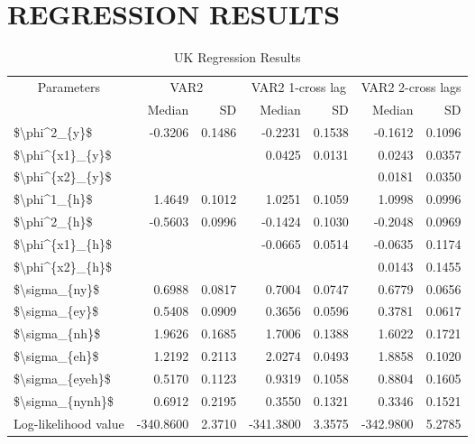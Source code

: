 \documentclass[
]{article}
\author{}
\date{\vspace{-2.5em}}
\begin{document}
\hypertarget{regression-results}{%
\section{REGRESSION RESULTS}\label{regression-results}}

\begin{table}

\caption{\label{tab:unnamed-chunk-1}UK Regression Results}
\centering
\begin{tabular}[t]{lrrrrrr}
\toprule
\multicolumn{1}{c}{Parameters} & \multicolumn{2}{c}{VAR2} & \multicolumn{2}{c}{VAR2 1-cross lag} & \multicolumn{2}{c}{VAR2 2-cross lags} \\
\cmidrule(l{3pt}r{3pt}){1-1} \cmidrule(l{3pt}r{3pt}){2-3} \cmidrule(l{3pt}r{3pt}){4-5} \cmidrule(l{3pt}r{3pt}){6-7}
  & Median & SD & Median & SD & Median & SD\\
\midrule
\$\textbackslash{}phi\textasciicircum{}2\_\{y\}\$ & -0.3206 & 0.1486 & -0.2231 & 0.1538 & -0.1612 & 0.1096\\
\$\textbackslash{}phi\textasciicircum{}\{x1\}\_\{y\}\$ &  &  & 0.0425 & 0.0131 & 0.0243 & 0.0357\\
\$\textbackslash{}phi\textasciicircum{}\{x2\}\_\{y\}\$ &  &  &  &  & 0.0181 & 0.0350\\
\$\textbackslash{}phi\textasciicircum{}1\_\{h\}\$ & 1.4649 & 0.1012 & 1.0251 & 0.1059 & 1.0998 & 0.0996\\
\$\textbackslash{}phi\textasciicircum{}2\_\{h\}\$ & -0.5603 & 0.0996 & -0.1424 & 0.1030 & -0.2048 & 0.0969\\
\addlinespace
\$\textbackslash{}phi\textasciicircum{}\{x1\}\_\{h\}\$ &  &  & -0.0665 & 0.0514 & -0.0635 & 0.1174\\
\$\textbackslash{}phi\textasciicircum{}\{x2\}\_\{h\}\$ &  &  &  &  & 0.0143 & 0.1455\\
\$\textbackslash{}sigma\_\{ny\}\$ & 0.6988 & 0.0817 & 0.7004 & 0.0747 & 0.6779 & 0.0656\\
\$\textbackslash{}sigma\_\{ey\}\$ & 0.5408 & 0.0909 & 0.3656 & 0.0596 & 0.3781 & 0.0617\\
\$\textbackslash{}sigma\_\{nh\}\$ & 1.9626 & 0.1685 & 1.7006 & 0.1388 & 1.6022 & 0.1721\\
\addlinespace
\$\textbackslash{}sigma\_\{eh\}\$ & 1.2192 & 0.2113 & 2.0274 & 0.0493 & 1.8858 & 0.1020\\
\$\textbackslash{}sigma\_\{eyeh\}\$ & 0.5170 & 0.1123 & 0.9319 & 0.1058 & 0.8804 & 0.1605\\
\$\textbackslash{}sigma\_\{nynh\}\$ & 0.6912 & 0.2195 & 0.3550 & 0.1321 & 0.3346 & 0.1521\\
Log-likelihood value & -340.8600 & 2.3710 & -341.3800 & 3.3575 & -342.9800 & 5.2785\\
\bottomrule
\end{tabular}
\end{table}
\end{document}
